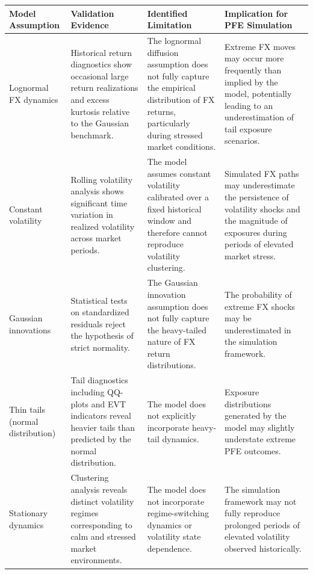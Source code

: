 \begin{table}[H]
	\centering
	\small
	\renewcommand{\arraystretch}{1.3}
	\begin{tabularx}{\textwidth}{p{3cm}p{4cm}p{4cm}X}
		\toprule
		\textbf{Model Assumption} &
		\textbf{Validation Evidence} &
		\textbf{Identified Limitation} &
		\textbf{Implication for PFE Simulation} \\
		\midrule
		
		Lognormal FX dynamics &
		Historical return diagnostics show occasional large return realizations and excess kurtosis relative to the Gaussian benchmark. &
		The lognormal diffusion assumption does not fully capture the empirical distribution of FX returns, particularly during stressed market conditions. &
		Extreme FX moves may occur more frequently than implied by the model, potentially leading to an underestimation of tail exposure scenarios. \\
		
		Constant volatility &
		Rolling volatility analysis shows significant time variation in realized volatility across market periods. &
		The model assumes constant volatility calibrated over a fixed historical window and therefore cannot reproduce volatility clustering. &
		Simulated FX paths may underestimate the persistence of volatility shocks and the magnitude of exposures during periods of elevated market stress. \\
		
		Gaussian innovations &
		Statistical tests on standardized residuals reject the hypothesis of strict normality. &
		The Gaussian innovation assumption does not fully capture the heavy-tailed nature of FX return distributions. &
		The probability of extreme FX shocks may be underestimated in the simulation framework. \\
		
		Thin tails (normal distribution) &
		Tail diagnostics including QQ-plots and EVT indicators reveal heavier tails than predicted by the normal distribution. &
		The model does not explicitly incorporate heavy-tail dynamics. &
		Exposure distributions generated by the model may slightly understate extreme PFE outcomes. \\
		
		Stationary dynamics &
		Clustering analysis reveals distinct volatility regimes corresponding to calm and stressed market environments. &
		The model does not incorporate regime-switching dynamics or volatility state dependence. &
		The simulation framework may not fully reproduce prolonged periods of elevated volatility observed historically. \\
		

\end{tabularx}
\end{table}

